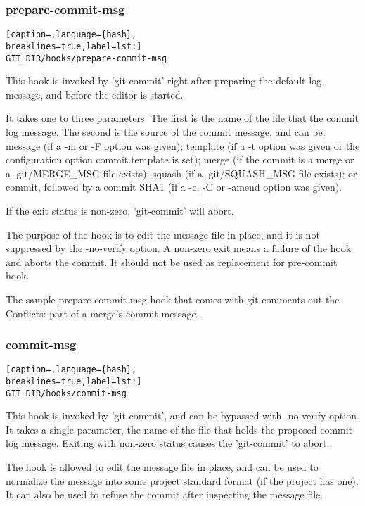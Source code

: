 \subsubsection{prepare-commit-msg}
\lstset{basicstyle=\scriptsize, numbers=none, captionpos=b, tabsize=4}
\begin{lstlisting}[caption=,language={bash},
breaklines=true,label=lst:]
GIT_DIR/hooks/prepare-commit-msg
\end{lstlisting}

This hook is invoked by 'git-commit' right after preparing the default log
message, and before the editor is started.

It takes one to three parameters. The first is the name of the file that the
commit log message. The second is the source of the commit message, and can be:
message (if a -m or -F option was given); template (if a -t option was given or
the configuration option commit.template is set); merge (if the commit is a
merge or a .git/MERGE\_MSG file exists); squash (if a .git/SQUASH\_MSG file
exists); or commit, followed by a commit SHA1 (if a -c, -C or \--amend option
was given).

If the exit status is non-zero, 'git-commit' will abort.

The purpose of the hook is to edit the message file in place, and it is not
suppressed by the \--no-verify option. A non-zero exit means a failure of the
hook and aborts the commit. It should not be used as replacement for pre-commit
hook.

The sample prepare-commit-msg hook that comes with git comments out the
Conflicts: part of a merge's commit message.

\subsubsection{commit-msg}
\lstset{basicstyle=\scriptsize, numbers=none, captionpos=b, tabsize=4}
\begin{lstlisting}[caption=,language={bash},
breaklines=true,label=lst:]
GIT_DIR/hooks/commit-msg
\end{lstlisting}

This hook is invoked by 'git-commit', and can be bypassed with \--no-verify
option. It takes a single parameter, the name of the file that holds the
proposed commit log message. Exiting with non-zero status causes the
'git-commit' to abort.

The hook is allowed to edit the message file in place, and can be used to
normalize the message into some project standard format (if the project has
one). It can also be used to refuse the commit after inspecting the message
file.

